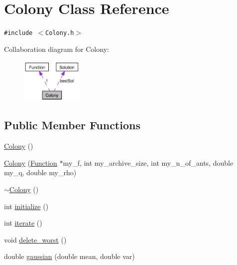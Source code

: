 \hypertarget{classColony}{
\section{Colony Class Reference}
\label{classColony}
}
{\tt \#include $<$Colony.h$>$}

Collaboration diagram for Colony:\nopagebreak
\begin{figure}[H]
\begin{center}
\leavevmode
\includegraphics[width=83pt]{classColony__coll__graph}
\end{center}
\end{figure}
\subsection*{Public Member Functions}
\begin{CompactItemize}
\item 
\hyperlink{classColony_af760edad97dee7263b86913d3bb4f98}{Colony} ()
\item 
\hyperlink{classColony_13871283edd253b794363e33a8920f6b}{Colony} (\hyperlink{classFunction}{Function} $\ast$my\_\-f, int my\_\-archive\_\-size, int my\_\-n\_\-of\_\-ants, double my\_\-q, double my\_\-rho)
\item 
\hyperlink{classColony_9cebe4a25260c8da7c99d10b0dab5a4e}{$\sim$Colony} ()
\item 
int \hyperlink{classColony_c46a39e897255d72662ed9b1677bc91a}{initialize} ()
\item 
int \hyperlink{classColony_81a0f7680e31680188f40f5293510711}{iterate} ()
\item 
void \hyperlink{classColony_ca86ca3a2dcad9f2e98edfb449c6bbe2}{delete\_\-worst} ()
\item 
double \hyperlink{classColony_392a128abc861f658f92aa98f6c21585}{gaussian} (double mean, double var)
\end{CompactItemize}
